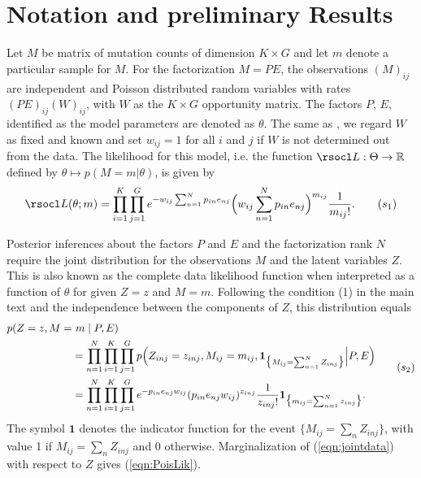\documentclass[11pt]{amsart}
\theoremstyle{definition}
\theoremstyle{remark}
\begin{document}
\tableofcontents 

\section{Notation and preliminary Results}
Let $M$ be matrix of mutation counts of dimension $K\times G$ and let
$m$ denote a particular sample for $M$. For the factorization $M=PE$,
the observations $(M)_{ij}$ are independent and Poisson distributed
random variables with rates $(PE)_{ij}(W)_{ij}$, with $W$ as the
$K\times G$ opportunity matrix. The factors $P$, $E$, identified as
the model parameters are denoted as $\theta$. The same as 
\cite{FICMV}, we regard $W$ as fixed and known and set $w_{ij} = 1$
for all $i$ and $j$ if $W$ is not determined out from the data. The
likelihood for this model, i.e. the function $\rsocl L: \Theta \to 
\mathbb R$ defined by $\theta \mapsto p(M=m|\theta)$, is given by 
\begin{equation}
  \label{eqn:PoisLik}
   \rsocl L(\theta; m) 
   =
    \prod_{i=1}^K \prod_{j=1}^G e^{-w_{ij}\sum_{n=1}^{N}p_{in}e_{nj}}
    \Big(w_{ij}\sum_{n=1}^{N}p_{in}e_{nj}\Big)^{m_{ij}}
    \frac{1}{m_{ij}!}.\tag{$s_1$}
\end{equation}

Posterior inferences about the factors $P$ and $E$ and the
factorization rank $N$ require the joint distribution for the
observations $M$ and the latent variables $Z$. This is also known as
the complete data likelihood function when interpreted as a function
of  $\theta$ for given $Z=z$ and $M=m$. Following the condition 
(1) in the main text and the independence between
the components of $Z$, this distribution equals
\begin{equation}
   \label{eqn:jointdata}
 \begin{aligned}
    p(Z = z, M =&\ m \mid P, E) \notag\\
  &= 
    \prod_{n=1}^N\prod_{i=1}^K\prod_{j=1}^G p\Big(Z_{inj} = z_{inj},
    M_{ij} = m_{ij}, \mathbf{1}_{\big\{M_{ij} = \sum_{n=1}^N
      Z_{inj}\big\}} \Big| P, E\Big)  \notag\\ 
  &=
    \prod_{n=1}^N\prod_{i=1}^K\prod_{j=1}^G e^{-p_{in}e_{nj}w_{ij}}
    (p_{in}e_{nj}w_{ij})^{z_{inj}} \frac{1}{z_{inj}!}
    \mathbf{1}_{\big\{m_{ij} = \sum_{n=1}^N z_{inj}\big\}}.
 \end{aligned}
 \tag{$s_2$}
\end{equation}
The symbol $\mathbf{1}$ denotes the indicator function for the  
event $\big\{M_{ij} = \sum_n Z_{inj}\big\}$, with value 1 if $M_{ij} =  
\sum_n  Z_{inj}$ and 0 otherwise. Marginalization of
(\ref{eqn:jointdata}) with respect to $Z$ gives  (\ref{eqn:PoisLik}).
\end{document}
